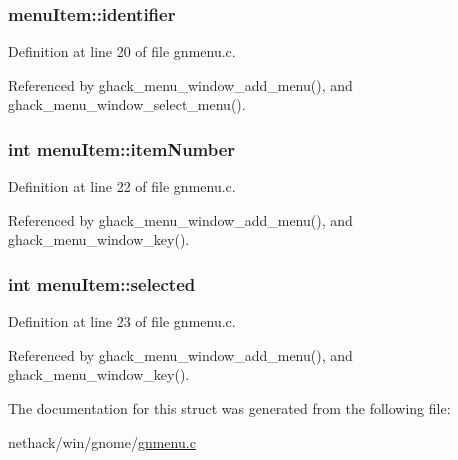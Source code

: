 \hypertarget{structmenuItem_a51df9eca851d9d5801f6e7a8088016d6}{
\subsubsection[{identifier}]{ menu\+Item\+::identifier}}\label{structmenuItem_a51df9eca851d9d5801f6e7a8088016d6}


Definition at line 20 of file gnmenu.\+c.



Referenced by ghack\+\_\+menu\+\_\+window\+\_\+add\+\_\+menu(), and ghack\+\_\+menu\+\_\+window\+\_\+select\+\_\+menu().

\hypertarget{structmenuItem_a110b1866aeaf1a16e0cd29e1088333a8}{
\subsubsection[{item\+Number}]{\setlength{\rightskip}{0pt plus 5cm}int menu\+Item\+::item\+Number}}\label{structmenuItem_a110b1866aeaf1a16e0cd29e1088333a8}


Definition at line 22 of file gnmenu.\+c.



Referenced by ghack\+\_\+menu\+\_\+window\+\_\+add\+\_\+menu(), and ghack\+\_\+menu\+\_\+window\+\_\+key().

\hypertarget{structmenuItem_a96b0d07f0e7ee05c3e1824c0a3665ddb}{
\subsubsection[{selected}]{\setlength{\rightskip}{0pt plus 5cm}int menu\+Item\+::selected}}\label{structmenuItem_a96b0d07f0e7ee05c3e1824c0a3665ddb}


Definition at line 23 of file gnmenu.\+c.



Referenced by ghack\+\_\+menu\+\_\+window\+\_\+add\+\_\+menu(), and ghack\+\_\+menu\+\_\+window\+\_\+key().



The documentation for this struct was generated from the following file\+:\begin{DoxyCompactItemize}
\item 
nethack/win/gnome/\hyperlink{gnmenu_8c}{gnmenu.\+c}\end{DoxyCompactItemize}
